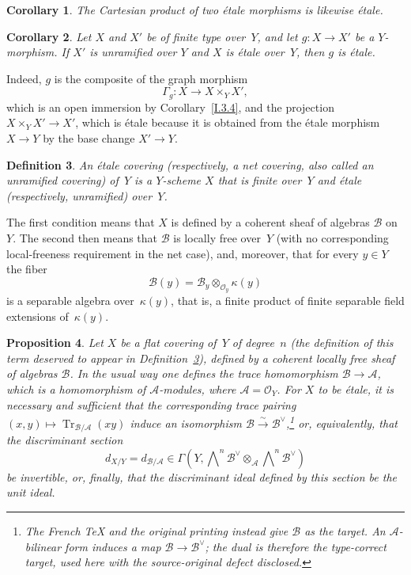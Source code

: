 \documentclass[11pt,oneside]{amsbook}
\newtheorem{proposition}{Proposition}[section]
\newtheorem{corollary}[proposition]{Corollary}
\newtheorem{definition}[proposition]{Definition}
\theoremstyle{remark}
\theoremstyle{plain}
\numberwithin{equation}{section}
\begin{document}
\begin{corollary}
\label{I.4.7}
The Cartesian product of two étale morphisms is likewise étale.
\end{corollary}

\begin{corollary}
\label{I.4.8}
Let \(X\) and \(X'\) be of finite type over~\(Y\), and let
\(g\colon X\to X'\) be a \(Y\)-morphism.  If \(X'\) is unramified over
\(Y\) and \(X\) is étale over~\(Y\), then \(g\) is étale.
\end{corollary}

Indeed, \(g\) is the composite of the graph morphism
\[
  \Gamma_g\colon X\longrightarrow X\times_Y X',
\]
which is an open immersion by Corollary~\ref{I.3.4}, and the projection
\(X\times_Y X'\to X'\), which is étale because it is obtained from the
étale morphism \(X\to Y\) by the base change \(X'\to Y\).

\begin{definition}
\label{I.4.9}
An \emph{étale covering} (respectively, a \emph{net covering}, also called
an unramified covering) of~\(Y\) is a \(Y\)-scheme \(X\) that is finite
over~\(Y\) and étale (respectively, unramified) over~\(Y\).
\end{definition}

The first condition means that \(X\) is defined by a coherent sheaf of
algebras \(\mathcal B\) on~\(Y\).  The second then means that \(\mathcal B\)
is locally free over~\(Y\) (with no corresponding local-freeness requirement
in the net case), and, moreover, that for every \(y\in Y\) the fiber
\[
  \mathcal B(y)=\mathcal B_y\otimes_{\mathcal O_y}\kappa(y)
\]
is a separable algebra over~\(\kappa(y)\), that is, a finite product of
finite separable field extensions of~\(\kappa(y)\).

\begin{proposition}
\label{I.4.10}
Let \(X\) be a flat covering of~\(Y\) of degree~\(n\) (the definition of
this term deserved to appear in Definition~\ref{I.4.9}), defined by a
coherent locally free sheaf of algebras \(\mathcal B\).  In the usual way one
defines the trace homomorphism \(\mathcal B\to\mathcal A\), which is a
homomorphism of \(\mathcal A\)-modules, where
\(\mathcal A=\mathcal O_Y\).  For \(X\) to be étale, it is necessary and
sufficient that the corresponding trace pairing
\((x,y)\longmapsto\operatorname{Tr}_{\mathcal B/\mathcal A}(xy)\) induce an
isomorphism \(\mathcal B\xrightarrow{\sim}\mathcal B^\vee\),\footnote{The French TeX and the
original printing instead give \(\mathcal B\) as the target.  An
\(\mathcal A\)-bilinear form induces a map
\(\mathcal B\to\mathcal B^\vee\); the dual is therefore the type-correct
target, used here with the source-original defect disclosed.} or,
equivalently,
that the \emph{discriminant section}
\[
  d_{X/Y}=d_{\mathcal B/\mathcal A}
  \in
  \Gamma\!\left(
    Y,
    \bigwedge\nolimits^n\mathcal B^\vee
    \otimes_{\mathcal A}
    \bigwedge\nolimits^n\mathcal B^\vee
  \right)
\]
be invertible, or, finally, that the discriminant ideal defined by this
section be the unit ideal.
\end{proposition}
\end{document}
